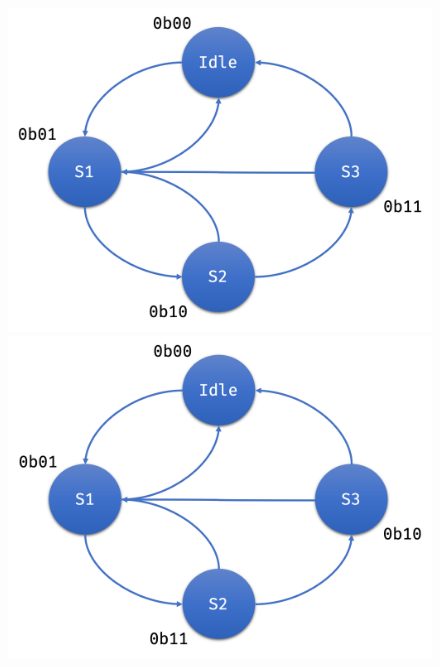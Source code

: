 \documentclass[a4paper]{report}
\begin{document}
\begin{figure}[h!]
    \centering
    \begin{minipage}{0.32\textwidth}
        \centering
        \includegraphics[width=\linewidth]{imgs/binary-encoding-fsm.png}
    \end{minipage}%
    \begin{minipage}{0.32\textwidth}
        \centering
        \includegraphics[width=\linewidth]{imgs/grey-encoding-fsm.png}
    \end{minipage}
    \begin{minipage}{0.35\textwidth}
        \centering

\end{minipage}
\end{figure}
\end{document}
